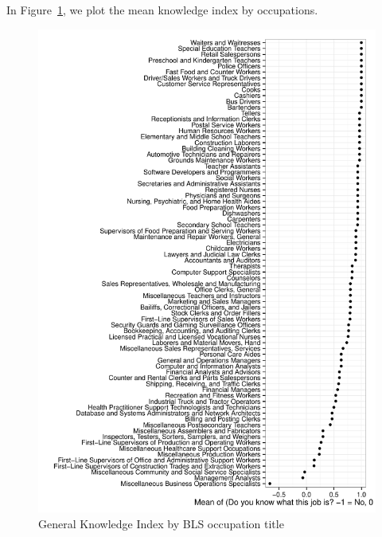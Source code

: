 \documentclass[12pt]{article}
\begin{document}
In Figure~\ref{fig:knowledge_by_occupation}, we plot the mean knowledge index by occupations.  

\begin{figure}
\caption{General Knowledge Index by BLS occupation title \label{fig:knowledge_by_occupation}} 
\centering
\begin{minipage}{0.85 \linewidth}
\includegraphics[width = \linewidth]{./plots/knowledge_by_occupation.pdf}
\end{minipage}  
\end{figure} 
\end{document}
